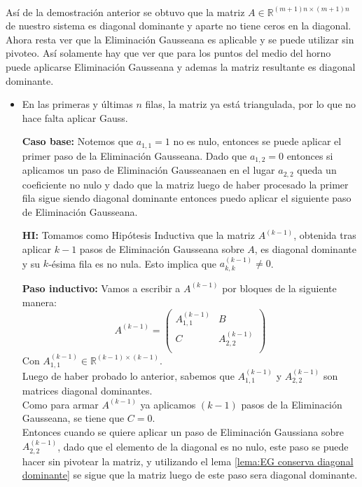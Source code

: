 \documentclass[12pt]{article}
\newcommand{\Gpmatrix}[1]{\ensuremath{\begin{pmatrix} #1 \end{pmatrix}}}
\newcommand{\sub}[3]{\ensuremath{#1_{#2,#3}}}
\begin{document}
\paragraph{} Así de la demostración anterior se obtuvo que la matriz \(A \in \mathbb{R}^{(m+1)n \times (m+1)n}\) de nuestro sistema es diagonal dominante y aparte no tiene ceros en la diagonal. Ahora resta ver que la Eliminación Gausseana es aplicable y se puede utilizar sin pivoteo. Así solamente hay que ver que para los puntos del medio del horno puede aplicarse Eliminación Gausseana y ademas la matriz resultante es diagonal dominante. 

\begin{itemize}
\item En las primeras y últimas \(n\) filas, la matriz ya está triangulada, por lo que no hace falta aplicar Gauss.

\item[\textbf{Caso base:}] Notemos que \(\sub{a}{1}{1} = 1\) no es nulo, entonces se puede aplicar el primer paso de la Eliminación Gausseana. Dado que \(\sub{a}{1}{2} =0\) entonces si aplicamos un paso de Eliminación Gausseanaen en el lugar $a_{2,2}$ queda un coeficiente no nulo y dado que la matriz luego de haber procesado la primer fila sigue siendo diagonal dominante entonces puedo aplicar el siguiente paso de Eliminación Gausseana. %

\item[\textbf{HI:}] Tomamos como Hipótesis Inductiva que la matriz \(A^{(k-1)}\), obtenida tras aplicar \(k-1\) pasos de Eliminación Gausseana sobre \(A\), es diagonal dominante y su \(k\)-ésima fila es no nula. Esto implica que \(\sub{a^{(k-1)}}{k}{k} \neq 0\).

\item[\textbf{Paso inductivo:}] Vamos a escribir a \(A^{(k-1)}\) por bloques de la siguiente manera:
\[
  A^{(k-1)} = \Gpmatrix{
    \sub{A^{(k-1)}}{1}{1} & B \\
    C & \sub{A^{(k-1)}}{2}{2} \\
  }
\]
Con \(\sub{A^{(k-1)}}{1}{1} \in \mathbb{R}^{(k-1) \times (k-1)}\). \\ %
Luego de haber probado lo anterior, sabemos que \(\sub{A^{(k-1)}}{1}{1}\) y \(\sub{A^{(k-1)}}{2}{2}\) son matrices diagonal dominantes. \\
Como para armar \(A^{(k-1)}\) ya aplicamos \((k-1)\) pasos de la Eliminación Gausseana, se tiene que \(C = 0\). \\
Entonces cuando se quiere aplicar un paso de Eliminación Gaussiana sobre \(\sub{A^{(k-1)}}{2}{2}\), dado que el elemento de la diagonal es no nulo, este paso se puede hacer sin pivotear la matriz, y utilizando el lema \ref{lema:EG conserva diagonal dominante} se sigue que la matriz luego de este paso sera diagonal dominante.


\end{itemize}
\end{document}
